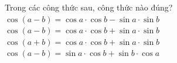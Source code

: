 

\begin{ex}%
	 Trong các công thức sau, công thức nào đúng?
	 \choice
		 {$\cos \left(a-b\right)=\cos a\cdot\cos b-\sin a\cdot\sin b$}
		{\True $\cos  \left(a-b\right)=\cos a\cdot\cos b+\sin a\cdot\sin b$}
		{$\cos \left(a+b\right)=\cos  a\cdot\cos b+\sin a\cdot\sin b$}
		{$\cos \left(a-b\right)=\sin  a\cdot\cos b+\sin b\cdot\cos a$}
\end{ex}





